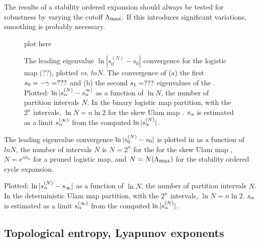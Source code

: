 The results of a stability ordered expansion
should always be tested for
robustness by varying the cutoff  $\stabCutoff$.
If this introduces significant variations,
smoothing is probably necessary.

\begin{figure}
\begin{center}
plot here %
\end{center}
\caption{
    {\small
The leading eigenvalue $\ln | s_0^{(N)} - s_0|$
convergence for the
logistic map (??), plotted {\em vs.} $ln N$.
The convergence of
(a)  the first $s_0 = - \gamma = ???$
and
(b)  the second $s_1 = ???$ eigenvalues
of the
\FP. Plotted:
$\ln |s_\alpha^{(N)}-s_\alpha^{\infty|}$
as a function of $\ln N$,
the number of partition intervals $N$.
In the binary
logistic map partition, with the $2^n$ intervals,
$\ln N= n \ln 2$ for the skew Ulam map .
$s_\alpha$ is estimated as a limit
$s_\alpha^{(\infty)}$ from the computed
$\ln |s_\alpha^{(N)}|$.
        }}
\label{fig:logStabOrder1}
\end{figure}


The leading eigenvalue convergence
$\ln |s_0^{(N)} - s_0|$ is plotted in
 as a function of
$ln N$,
the number of intervals $N$ is $N = 2^{n}$
for the for the skew Ulam map ,
$N =e^{n h_n}$ for a pruned logistic map, and $N = N(\stabCutoff)$
for the stability ordered cycle expansion.

Plotted:
$\ln |s_\alpha^{(N)}-s_\infty|$
as a function of $\ln N$,
the number of partition intervals $N$.
In the deterministic
Ulam map partition, with the $2^n$ intervals,
$\ln N= n \ln 2$.
$s_\alpha$ is estimated as a limit
$s_\alpha^{(\infty)}$ from the computed
$\ln |s_\alpha^{(N)}|$.



\subsection{Topological entropy, Lyapunov exponents}
\label{s-StOrdKS}

